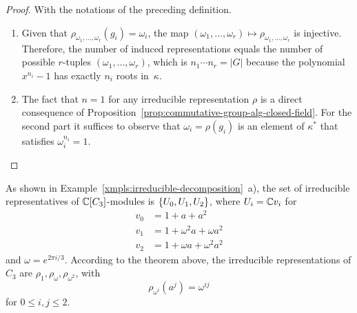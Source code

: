 \begin{proof} With the notations of the preceding definition.
    \begin{enumerate}[\rm a)]
        \item Given that $\rho_{\omega_1,\dots,\omega_r}(g_i)=\omega_i$, the map $(\omega_1,\dots,\omega_r)\mapsto\rho_{\omega_1,\dots,\omega_r}$ is injective. Therefore, the number of induced representations equals the number of possible $r$-tuples $(\omega_1,\dots,\omega_r)$, which is $n_1\cdots n_r=|G|$ because the polynomial $x^{n_i}-1$ has exactly $n_i$ roots in~$\kappa$.

        \item The fact that $n=1$ for any irreducible representation $\rho$ is a direct consequence of Proposition~\ref{prop:commutative-group-alg-closed-field}. For the second part it suffices to observe that $\omega_i=\rho(g_i)$ is an element of $\kappa^*$ that satisfies $\omega_i^{n_i}=1$.
    \end{enumerate}
\end{proof}

\begin{xmpl}
    As shown in Example~\ref{xmpls:irreducible-decomposition}~a), the set of irreducible representatives of $\mathbb{C}[C_3]$-modules is $\{U_0,U_1,U_2\}$, where $U_i=\mathbb{C} v_i$ for
    \begin{align*}
        v_0 &= 1+a+a^2\\
        v_1 &= 1+\omega^2a+\omega a^2\\
        v_2 &= 1+\omega a+\omega^2a^2
    \end{align*}
    and $\omega = e^{2\pi i/3}$. According to the theorem above, the irreducible representations of $C_3$ are $\rho_1,\rho_\omega,\rho_{\omega^2}$, with
    $$
        \rho_{\omega^i}(a^j)=\omega^{ij}
    $$
    for $0\le i,j\le 2$.
\end{xmpl}

\medskip

